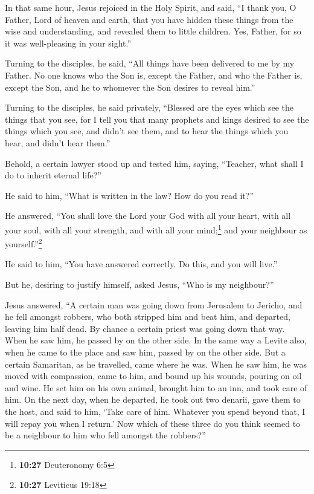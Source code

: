  In that same hour, Jesus rejoiced in the Holy Spirit,
and said, ``I thank you, O Father, Lord of heaven and earth, that you
have hidden these things from the wise and understanding, and revealed
them to little children. Yes, Father, for so it was well-pleasing in
your sight.''

 Turning to the disciples, he said, ``All things have
been delivered to me by my Father. No one knows who the Son is, except
the Father, and who the Father is, except the Son, and he to whomever
the Son desires to reveal him.''

 Turning to the disciples, he said privately, ``Blessed
are the eyes which see the things that you see,  for I
tell you that many prophets and kings desired to see the things which
you see, and didn't see them, and to hear the things which you hear, and
didn't hear them.''

 Behold, a certain lawyer stood up and tested him,
saying, ``Teacher, what shall I do to inherit eternal life?''

 He said to him, ``What is written in the law? How do you
read it?''

 He answered, ``You shall love the Lord your God with all
your heart, with all your soul, with all your strength, and with all
your mind;\footnote{\textbf{10:27} Deuteronomy 6:5} and your neighbour
as yourself.''\footnote{\textbf{10:27} Leviticus 19:18}

 He said to him, ``You have answered correctly. Do this,
and you will live.''

 But he, desiring to justify himself, asked Jesus, ``Who
is my neighbour?''

 Jesus answered, ``A certain man was going down from
Jerusalem to Jericho, and he fell amongst robbers, who both stripped him
and beat him, and departed, leaving him half dead.  By
chance a certain priest was going down that way. When he saw him, he
passed by on the other side.  In the same way a Levite
also, when he came to the place and saw him, passed by on the other
side.  But a certain Samaritan, as he travelled, came
where he was. When he saw him, he was moved with compassion,
 came to him, and bound up his wounds, pouring on oil and
wine. He set him on his own animal, brought him to an inn, and took care
of him.  On the next day, when he departed, he took out
two denarii, gave them to the host, and said to him, `Take care of him.
Whatever you spend beyond that, I will repay you when I return.'
 Now which of these three do you think seemed to be a
neighbour to him who fell amongst the robbers?''

